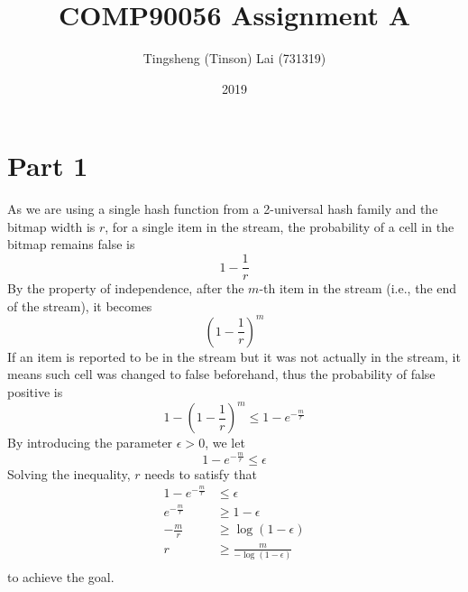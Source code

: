 \documentclass[a4paper]{article}
\title{\textbf{COMP90056 Assignment A}}
\author{Tingsheng (Tinson) Lai (731319)}
\date{2019}
\begin{document}
    \maketitle
    \section{Part 1}
        As we are using a single hash function from a 2-universal hash family and the bitmap width is $r$, for a single item in the stream, the probability of a cell in the bitmap remains false is
        $$1 - \frac{1}{r}$$
        By the property of independence, after the $m$-th item in the stream (i.e., the end of the stream), it becomes
        $$\left( 1 - \frac{1}{r} \right)^m$$
        If an item is reported to be in the stream but it was not actually in the stream, it means such cell was changed to false beforehand, thus the probability of false positive is
        $$1 - \left( 1 - \frac{1}{r} \right)^m \leq 1 - e^{-\frac{m}{r}}$$
        By introducing the parameter $\epsilon > 0$, we let
        $$1 - e^{-\frac{m}{r}} \leq \epsilon$$
        Solving the inequality, $r$ needs to satisfy that
        \begin{equation*}
            \begin{split}
                1 - e^{-\frac{m}{r}} & \leq \epsilon \\
                e^{-\frac{m}{r}} & \geq 1 - \epsilon \\
                -\frac{m}{r} & \geq \log{\left( 1 - \epsilon \right)} \\
                r & \geq \frac{m}{-\log\left( 1 - \epsilon \right)} \\
            \end{split}
        \end{equation*}
        to achieve the goal.
\end{document}
